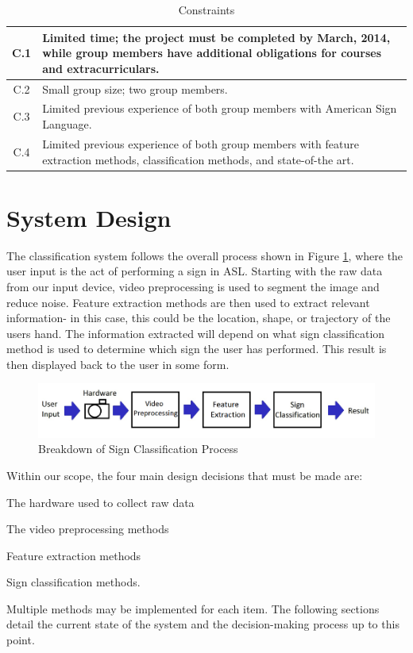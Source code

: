 \documentclass[12pt]{article}
\begin{document}
\begin{table}[H]
\centering
\caption{Constraints}
\label{table:Constraints}
\begin{tabular}{|c| p{14cm} |}
	\hline
	C.1 & Limited time; the project must be completed by March, 2014, while group members have additional obligations for courses and extracurriculars. \\ \hline
	C.2 & Small group size; two group members. \\ \hline
	C.3 & Limited previous experience of both group members with American Sign Language. \\  \hline
	C.4 & Limited previous experience of both group members with feature extraction methods, classification methods, and state-of-the art. \\ \hline
\end{tabular}
\end{table}

\newpage
\section{System Design}
The classification system follows the overall process shown in Figure \ref{fig:Process}, where the user input is the act of performing a sign in ASL. Starting with the raw data from our input device, video preprocessing is used to segment the image and reduce noise. Feature extraction methods are then used to extract relevant information- in this case, this could be the location, shape, or trajectory of the users hand. The information extracted will depend on what sign classification method is used to determine which sign the user has performed. This result is then displayed back to the user in some form.

\begin{figure}[h!]
  \centering
  \includegraphics[scale=1]{Process.png}
  \caption{Breakdown of Sign Classification Process}
  \label{fig:Process}
\end{figure}

Within our scope, the four main design decisions that must be made are:
\begin{enumerate*}
	\item The hardware used to collect raw data 
	\item The video preprocessing methods 
	\item Feature extraction methods 
	\item Sign classification methods. 
\end{enumerate*}
Multiple methods may be implemented for each item. The following sections detail the current state of the system and the decision-making process up to this point.
\end{document}
